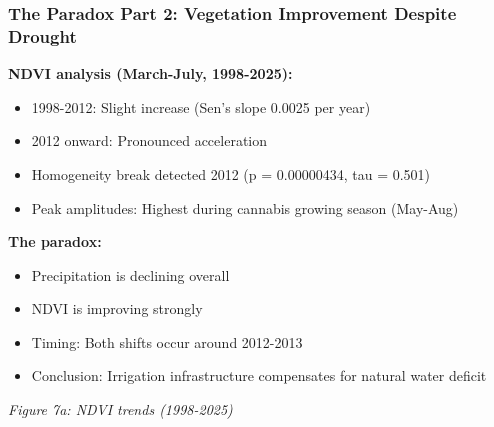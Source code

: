 \documentclass{beamer}
\begin{document}
\begin{frame}
\frametitle{The Paradox Part 2: Vegetation Improvement Despite Drought}

\textbf{NDVI analysis (March-July, 1998-2025):}
\begin{itemize}
  \item 1998-2012: Slight increase (Sen's slope 0.0025 per year)
  \item 2012 onward: Pronounced acceleration
  \item Homogeneity break detected 2012 (p = 0.00000434, tau = 0.501)
  \item Peak amplitudes: Highest during cannabis growing season (May-Aug)
\end{itemize}

\textbf{The paradox:}
\begin{itemize}
  \item Precipitation is declining overall
  \item NDVI is improving strongly
  \item Timing: Both shifts occur around 2012-2013
  \item Conclusion: Irrigation infrastructure compensates for natural water deficit
\end{itemize}

\begin{center}
  \small{\textit{Figure 7a: NDVI trends (1998-2025)}}
\end{center}
\end{frame}
\end{document}
